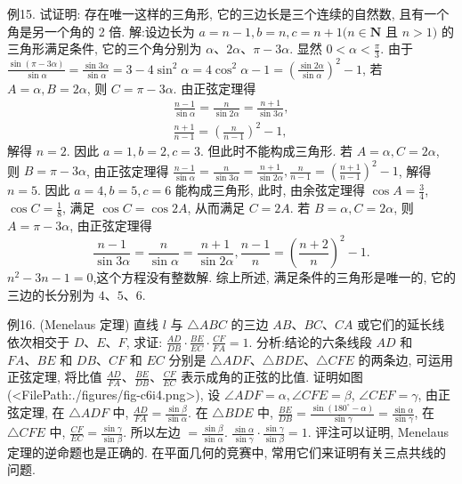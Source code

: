 例15. 试证明: 存在唯一这样的三角形, 它的三边长是三个连续的自然数, 且有一个角是另一个角的 2 倍.
解:设边长为 $a=n-1, b=n, c=n+1(n \in \mathbf{N}$ 且 $n>1)$ 的三角形满足条件, 它的三个角分别为 $\alpha 、 2 \alpha 、 \pi-3 \alpha$. 显然 $0<\alpha<\frac{\pi}{3}$.
由于 $\frac{\sin (\pi-3 \alpha)}{\sin \alpha}=\frac{\sin 3 \alpha}{\sin \alpha}=3-4 \sin ^2 \alpha=4 \cos ^2 \alpha-1=\left(\frac{\sin 2 \alpha}{\sin \alpha}\right)^2-1$,
 若 $A=\alpha, B=2 \alpha$, 则 $C=\pi-3 \alpha$. 由正弦定理得
$$
\begin{gathered}
\frac{n-1}{\sin \alpha}=\frac{n}{\sin 2 \alpha}=\frac{n+1}{\sin 3 \alpha}, \\
\frac{n+1}{n-1}=\left(\frac{n}{n-1}\right)^2-1,
\end{gathered}
$$
解得 $n=2$. 因此 $a=1, b=2, c=3$. 但此时不能构成三角形.
 若 $A=\alpha, C=2 \alpha$, 则 $B=\pi-3 \alpha$, 由正弦定理得 $\frac{n-1}{\sin \alpha}=\frac{n}{\sin 3 \alpha}= \frac{n+1}{\sin 2 \alpha}, \frac{n}{n-1}=\left(\frac{n+1}{n-1}\right)^2-1$, 解得 $n=5$.
因此 $a=4, b=5, c=6$ 能构成三角形, 此时, 由余弦定理得 $\cos A=\frac{3}{4}$, $\cos C=\frac{1}{8}$, 满足 $\cos C=\cos 2 A$, 从而满足 $C=2 A$.
 若 $B=\alpha, C=2 \alpha$, 则 $A=\pi-3 \alpha$, 由正弦定理得
$$
\frac{n-1}{\sin 3 \alpha}=\frac{n}{\sin \alpha}=\frac{n+1}{\sin 2 \alpha}, \frac{n-1}{n}=\left(\frac{n+2}{n}\right)^2-1 .
$$
$n^2-3 n-1=0$,这个方程没有整数解.
综上所述, 满足条件的三角形是唯一的, 它的三边的长分别为 $4 、 5 、 6$.



例16. (Menelaus 定理) 直线 $l$ 与 $\triangle A B C$ 的三边 $A B 、 B C 、 C A$ 或它们的延长线依次相交于 $D 、 E 、 F$, 求证: $\frac{A D}{D B} \cdot \frac{B E}{E C} \cdot \frac{C F}{F A}=1$.
分析:结论的六条线段 $A D$ 和 $F A 、 B E$ 和 $D B 、 C F$ 和 $E C$ 分别是 $\triangle A D F 、 \triangle B D E 、 \triangle C F E$ 的两条边, 可运用正弦定理, 将比值 $\frac{A D}{F A} 、 \frac{B E}{D B} 、 \frac{C F}{E C}$ 表示成角的正弦的比值.
证明如图(<FilePath:./figures/fig-c6i4.png>), 设 $\angle A D F=\alpha, \angle C F E=\beta$, $\angle C E F=\gamma$, 由正弦定理, 在 $\triangle A D F$ 中, $\frac{A D}{F A}=\frac{\sin \beta}{\sin \alpha}$.
在 $\triangle B D E$ 中, $\frac{B E}{D B}=\frac{\sin \left(180^{\circ}-\alpha\right)}{\sin \gamma}=\frac{\sin \alpha}{\sin \gamma}$, 在 $\triangle C F E$ 中, $\frac{C F}{E C}=\frac{\sin \gamma}{\sin \beta}$. 所以左边 $=\frac{\sin \beta}{\sin \alpha}$.
$\frac{\sin \alpha}{\sin \gamma} \cdot \frac{\sin \gamma}{\sin \beta}=1$.
评注可以证明, Menelaus 定理的逆命题也是正确的.
在平面几何的竞赛中, 常用它们来证明有关三点共线的问题.



